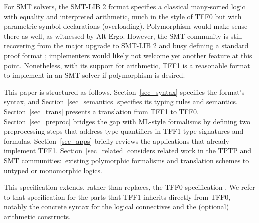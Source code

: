 For SMT solvers, the SMT-LIB 2 format \cite{barrett-et-al-2010} specifies a
classical many-sorted logic with equality and interpreted arithmetic, much in
the style of TFF0 but with parametric symbol declarations (overloading).
Polymorphism would make sense there as well, as witnessed by Alt-Ergo.
However, the SMT community is still recovering from the major
upgrade to SMT-LIB 2 and busy defining a standard proof format
\cite{besson-et-al-2011}; implementers would likely not welcome yet another
feature at this point. Nonetheless, with its support for arithmetic, TFF1 is a
reasonable format to implement in an SMT solver if polymorphism is desired.

\newcommand\cheat{\vskip0.3ex} %

This paper is structured as follows.
Section~\ref{sec_syntax} specifies the format's syntax, and
Section~\ref{sec_semantics} specifies its typing rules and semantics.
Section~\ref{sec_trans} presents a translation from TFF1 to TFF0.
Section~\ref{sec_preproc} bridges the gap with ML-style formalisms by defining
two preprocessing steps that address type quantifiers in TFF1 type signatures
and formulas.
Section~\ref{sec_apps} briefly reviews the applications that already implement TFF1.
Section~\ref{sec_related} considers related work in the TPTP and SMT
communities:\ existing polymorphic formalisms and translation schemes
to untyped or monomorphic logics.

This specification extends, rather than replaces, the TFF0 specification
\cite{sutcliffe-et-al-2012-tff0}. We refer to that specification for the parts
that TFF1 inherits directly from TFF0, notably the
concrete syntax for the logical connectives and the
(optional) arithmetic constructs.
